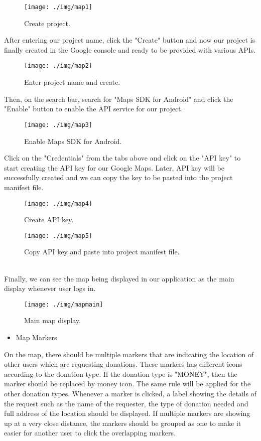 \documentclass[conference]{IEEEtran}
\begin{document}
\begin{figure}[h!]
\texttt{[image: ./img/map1]}
\centering
\caption{Create project.}
\end{figure}
After entering our project name, click the "Create" button and now our project is finally created in the Google console and ready to be provided with various APIs.\\
\begin{figure}[h!]
\texttt{[image: ./img/map2]}
\centering
\caption{Enter project name and create.}
\end{figure}
Then, on the search bar, search for "Maps SDK for Android" and click the "Enable" button to enable the API service for our project.
\begin{figure}[h!]
\texttt{[image: ./img/map3]}
\centering
\caption{Enable Maps SDK for Android.}
\end{figure}
Click on the "Credentials" from the tabs above and click on the "API key" to start creating the API key for our Google Maps. Later, API key will be successfully created and we can copy the key to be pasted into the project manifest file.
\begin{figure}[h!]
\texttt{[image: ./img/map4]}
\centering
\caption{Create API key.}
\end{figure}
\begin{figure}[h!]
\texttt{[image: ./img/map5]}
\centering
\caption{Copy API key and paste into project manifest file.}
\end{figure}
\\Finally, we can see the map being displayed in our application as the main display whenever user logs in.

\begin{figure}[h!]
\texttt{[image: ./img/mapmain]}
\centering
\caption{Main map display.}
\end{figure}
\begin{itemize}
\item Map Markers
\end{itemize}
\par On the map, there should be multiple markers that are indicating the location of other users which are requesting donations. These markers has different icons according to the donation type. If the donation type is "MONEY", then the marker should be replaced by money icon. The same rule will be applied for the other donation types. Whenever a marker is clicked, a label showing the details of the request such as the name of the requester, the type of donation needed and full address of the location should be displayed. If multiple markers are showing up at a very close distance, the markers should be grouped as one to make it easier for another user to click the overlapping markers. 
\end{document}
